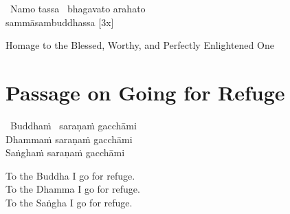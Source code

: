 



\begin{pali-hang-together}
  \anglebracketleft\ \hspace{-0.5mm}Namo tassa \hspace{-0.5mm}\anglebracketright\ bhagavato arahato \ifninebythirteen\\ \fi sammāsambuddhassa \hfill{[3x]}
\end{pali-hang-together}


\begin{english-hang}
  Homage to the Blessed, Worthy, and Perfectly Enlightened One
\end{english-hang}

\suttaRef{[DN 21]}

\clearpage



\section{Passage on Going for Refuge}
\label{passage-on-going-for-refuge}

\begin{pali-hang-together}
  \anglebracketleft\ \hspace{-0.5mm}Buddhaṁ \hspace{-0.5mm}\anglebracketright\  saraṇaṁ gacchāmi\\
  Dhammaṁ saraṇaṁ gacchāmi\\
  Saṅghaṁ saraṇaṁ gacchāmi
\end{pali-hang-together}

\begin{english-verses}
  To the Buddha I go for refuge.\\
  To the Dhamma I go for refuge.\\
  To the Saṅgha I go for refuge.
\end{english-verses}

